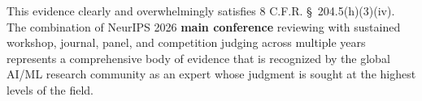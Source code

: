 This evidence clearly and overwhelmingly satisfies 8 C.F.R. \S\ 204.5(h)(3)(iv). The combination of NeurIPS 2026 \textbf{main conference} reviewing with sustained workshop, journal, panel, and competition judging across multiple years represents a comprehensive body of evidence that \dr is recognized by the global AI/ML research community as an expert whose judgment is sought at the highest levels of the field.
